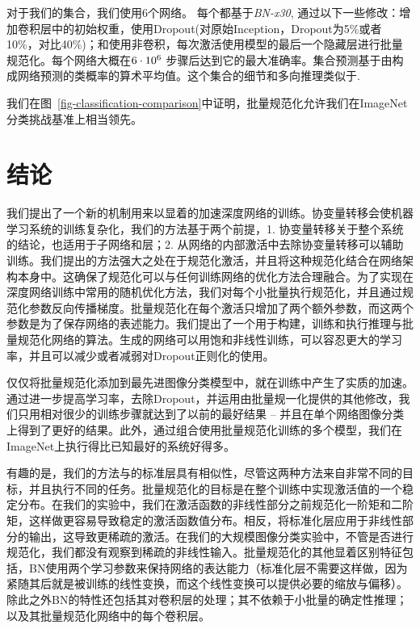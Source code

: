 \documentclass[twocolumn]{article}
\begin{document}

对于我们的集合，我们使用6个网络。 每个都基于{\sl BN-x30},
通过以下一些修改：增加卷积层中的初始权重，使用Dropout(对原始Inception，Dropout为5\%或者10\%，对比40\%)；和使用非卷积，每次激活使用模型的最后一个隐藏层进行批量规范化。每个网络大概在$6\cdot 10^6$ 步骤后达到它的最大准确率。集合预测基于由构成网络预测的类概率的算术平均值。这个集合的细节和多向推理类似于\cite{inception}.

我们在图~\ref{fig-classification-comparison}中证明，批量规范化允许我们在ImageNet分类挑战基准上相当领先。

\section{结论}
我们提出了一个新的机制用来以显着的加速深度网络的训练。协变量转移会使机器学习系统的训练复杂化，我们的方法基于两个前提，1. 协变量转移关于整个系统的结论，也适用于子网络和层；2. 从网络的内部激活中去除协变量转移可以辅助训练。我们提出的方法强大之处在于规范化激活，并且将这种规范化结合在网络架构本身中。这确保了规范化可以与任何训练网络的优化方法合理融合。为了实现在深度网络训练中常用的随机优化方法，我们对每个小批量执行规范化，并且通过规范化参数反向传播梯度。批量规范化在每个激活只增加了两个额外参数，而这两个参数是为了保存网络的表述能力。我们提出了一个用于构建，训练和执行推理与批量规范化网络的算法。生成的网络可以用饱和非线性训练，可以容忍更大的学习率，并且可以减少或者减弱对Dropout正则化的使用。

仅仅将批量规范化添加到最先进图像分类模型中，就在训练中产生了实质的加速。通过进一步提高学习率，去除Dropout，并运用由批量规一化提供的其他修改，我们只用相对很少的训练步骤就达到了以前的最好结果 – 并且在单个网络图像分类上得到了更好的结果。此外，通过组合使用批量规范化训练的多个模型，我们在ImageNet上执行得比已知最好的系统好得多。

有趣的是，我们的方法与\cite{gulcehre}的标准层具有相似性，尽管这两种方法来自非常不同的目标，并且执行不同的任务。批量规范化的目标是在整个训练中实现激活值的一个稳定分布。在我们的实验中，我们在激活函数的非线性部分之前规范化一阶矩和二阶矩，这样做更容易导致稳定的激活函数值分布。相反，\cite{gulcehre}将标准化层应用于非线性部分的输出，这导致更稀疏的激活。在我们的大规模图像分类实验中，不管是否进行规范化，我们都没有观察到稀疏的非线性输入。批量规范化的其他显着区别特征包括，BN使用两个学习参数来保持网络的表达能力（标准化层不需要这样做，因为紧随其后就是被训练的线性变换，而这个线性变换可以提供必要的缩放与偏移）。除此之外BN的特性还包括其对卷积层的处理；其不依赖于小批量的确定性推理；以及其批量规范化网络中的每个卷积层。
\end{document}
